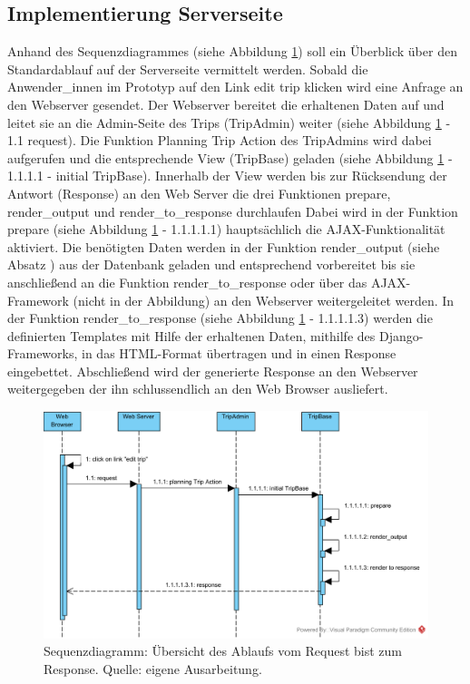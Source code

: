 \documentclass[Bachelorarbeit.tex]{subfiles}
\begin{document}
\subsection{Implementierung Serverseite}
\label{implServer}
Anhand des Sequenzdiagrammes (siehe Abbildung \ref{fig:Overview}) soll ein  Überblick über den Standardablauf auf der Serverseite vermittelt werden. 
Sobald die Anwender\_innen im  Prototyp auf den Link edit trip klicken wird eine  Anfrage an den Webserver gesendet.
Der Webserver bereitet die erhaltenen Daten auf und leitet sie an die Admin-Seite des Trips (TripAdmin) weiter (siehe Abbildung \ref{fig:Overview} - 1.1 request). 
Die Funktion Planning Trip Action des TripAdmins wird dabei aufgerufen und die entsprechende View (TripBase) geladen (siehe Abbildung \ref{fig:Overview} - 1.1.1.1 - initial TripBase).
Innerhalb der View werden bis zur Rücksendung der Antwort (Response) an den Web Server die drei Funktionen prepare, render\_output und render\_to\_response durchlaufen
Dabei wird in der Funktion prepare (siehe Abbildung \ref{fig:Overview} - 1.1.1.1.1) hauptsächlich die \ac{AJAX}-Funktionalität aktiviert.
Die benötigten Daten werden in der Funktion render\_output (siehe Absatz ) aus der Datenbank geladen und entsprechend vorbereitet bis sie anschließend an die Funktion render\_to\_response oder über das \ac{AJAX}-Framework (nicht in der Abbildung) an den Webserver weitergeleitet werden.
In der Funktion render\_to\_response (siehe Abbildung \ref{fig:Overview} - 1.1.1.1.3) werden die definierten Templates mit Hilfe der erhaltenen Daten, mithilfe des Django-Frameworks, in das \ac{HTML}-Format übertragen und in einen Response eingebettet.
Abschließend wird der generierte Response an den Webserver weitergegeben der ihn schlussendlich an den Web Browser ausliefert.


\begin{figure}[h]
\centering
\includegraphics[width=1\linewidth]{img/Implementierung/Overview}
\caption[k]{Sequenzdiagramm: Übersicht des Ablaufs vom Request bist zum Response. Quelle: eigene Ausarbeitung.}
\label{fig:Overview}
\end{figure}
\end{document}
